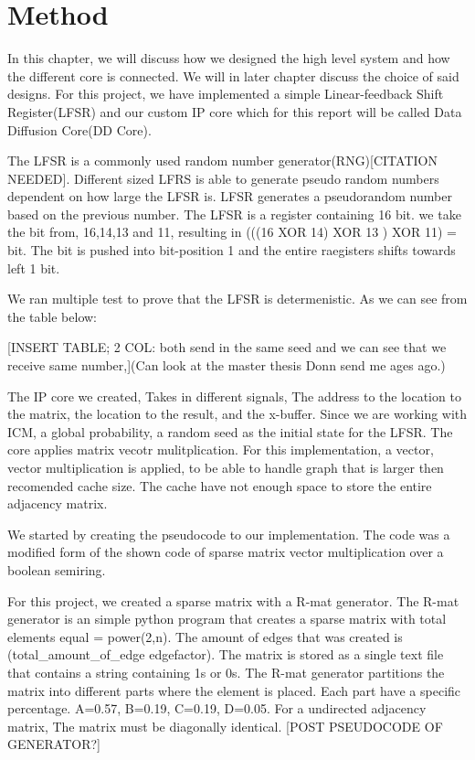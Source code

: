 \chapter{Method} \label{methode}
In this chapter, we will discuss how we designed the high level system and how the different core is connected. We will in later chapter discuss the choice of said designs. For this project, we have implemented a simple Linear-feedback Shift Register(LFSR) and our custom IP core which for this report will be called Data Diffusion Core(DD Core).


The LFSR is a commonly used random number generator(RNG)[CITATION NEEDED]. Different sized LFRS is able to generate pseudo random numbers dependent on how large the LFSR is. LFSR generates a pseudorandom number based on the previous number. The LFSR is a register containing 16 bit. we take the bit from, 16,14,13 and 11, resulting in (((16 XOR 14) XOR 13 ) XOR 11) = bit. The bit is pushed into bit-position 1 and the entire raegisters shifts towards left 1 bit. 

We ran multiple test to prove that the LFSR is determenistic. As we can see from the table below:

[INSERT TABLE; 2 COL: both send in the same seed and we can see that we receive same number,](Can look at the master thesis Donn send me ages ago.)

The IP core we created, Takes in different signals, The address to the location to the matrix, the location to the result, and the x-buffer. Since we are working with ICM, a global probability, a random seed as the initial state for the LFSR. The core applies matrix vecotr mulitplication. For this implementation, a vector, vector multiplication is applied, to be able to handle graph that is larger then recomended cache size. The cache have not enough space to store the entire adjacency matrix. 

We started by creating the pseudocode to our implementation. The code was a modified form of the shown code of sparse matrix vector multiplication over a boolean semiring.

For this project, we created a sparse matrix with a R-mat generator. The R-mat generator is an simple python program that creates a sparse matrix with total elements equal = power(2,n). The amount of edges that was created is (total_amount_of_edge \times edgefactor). The matrix is stored as a single text file that contains a string containing 1s or 0s. The R-mat generator partitions the matrix into different parts where the element is placed. Each part have a specific percentage. A=0.57, B=0.19, C=0.19, D=0.05. For a undirected adjacency matrix, The matrix must be diagonally identical. [POST PSEUDOCODE OF GENERATOR?]


